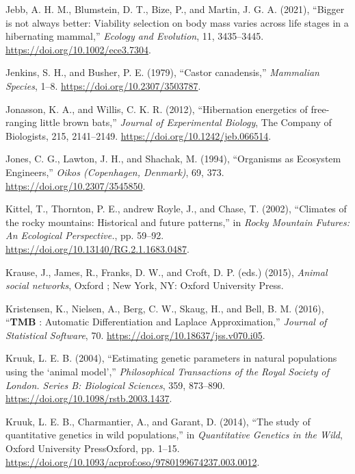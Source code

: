 \documentclass[
  12pt,
  letterpaper,
]{scrartcl}
\newlength{\cslhangindent}
\newenvironment{CSLReferences}[2] %
 {\begin{list}{}{%
  \setlength{\itemindent}{0pt}
  \setlength{\leftmargin}{0pt}
  \setlength{\parsep}{0pt}
  \ifodd #1
   \setlength{\leftmargin}{\cslhangindent}
   \setlength{\itemindent}{-1\cslhangindent}
  \fi
  \setlength{\itemsep}{#2\baselineskip}}}
 {\end{list}}
\begin{document}
\begin{CSLReferences}{1}{0}
Jebb, A. H. M., Blumstein, D. T., Bize, P., and Martin, J. G. A. (2021),
{``Bigger is not always better: {Viability} selection on body mass
varies across life stages in a hibernating mammal,''} \emph{Ecology and
Evolution}, 11, 3435--3445. \url{https://doi.org/10.1002/ece3.7304}.

Jenkins, S. H., and Busher, P. E. (1979), {``Castor canadensis,''}
\emph{Mammalian Species}, 1--8. \url{https://doi.org/10.2307/3503787}.

Jonasson, K. A., and Willis, C. K. R. (2012), {``Hibernation energetics
of free-ranging little brown bats,''} \emph{Journal of Experimental
Biology}, The Company of Biologists, 215, 2141--2149.
\url{https://doi.org/10.1242/jeb.066514}.

Jones, C. G., Lawton, J. H., and Shachak, M. (1994), {``Organisms as
{Ecosystem Engineers},''} \emph{Oikos (Copenhagen, Denmark)}, 69, 373.
\url{https://doi.org/10.2307/3545850}.

Kittel, T., Thornton, P. E., andrew Royle, J., and Chase, T. (2002),
{``Climates of the rocky mountains: {Historical} and future patterns,''}
in \emph{Rocky {Mountain Futures}: {An Ecological Perspective}.}, pp.
59--92. \url{https://doi.org/10.13140/RG.2.1.1683.0487}.

Krause, J., James, R., Franks, D. W., and Croft, D. P. (eds.) (2015),
\emph{Animal social networks}, Oxford ; New York, NY: Oxford University
Press.

Kristensen, K., Nielsen, A., Berg, C. W., Skaug, H., and Bell, B. M.
(2016), {``{\textbf{TMB}} : {Automatic Differentiation} and {Laplace
Approximation},''} \emph{Journal of Statistical Software}, 70.
\url{https://doi.org/10.18637/jss.v070.i05}.

Kruuk, L. E. B. (2004), {``Estimating genetic parameters in natural
populations using the {`animal model'},''} \emph{Philosophical
Transactions of the Royal Society of London. Series B: Biological
Sciences}, 359, 873--890. \url{https://doi.org/10.1098/rstb.2003.1437}.

Kruuk, L. E. B., Charmantier, A., and Garant, D. (2014), {``The study of
quantitative genetics in wild populations,''} in \emph{Quantitative
{Genetics} in the {Wild}}, Oxford University PressOxford, pp. 1--15.
\url{https://doi.org/10.1093/acprof:oso/9780199674237.003.0012}.


\end{CSLReferences}
\end{document}
